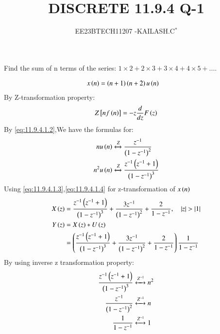 \documentclass[journal,12pt,twocolumn]{IEEEtran}
\theoremstyle{remark}
\begin{document}

\vspace{3cm}

\title{DISCRETE 11.9.4 Q-1}
\author{EE23BTECH11207 -KAILASH.C$^{*}$%
}
\maketitle
\newpage
\bigskip

\renewcommand{\thefigure}{\theenumi}
\renewcommand{\thetable}{\theenumi}


Find the sum of n terms of the series:
$1\times2+2\times3+3\times4+4\times5+....$\\
\solution
\fi

\begin{align}
 x\left(n\right)&=\left(n+1\right)\left(n+2\right)u\left(n\right)\label{eq:11.9.4.1.1}
\end{align}
By Z-transformation property:
\begin{align}
Z{}\left[nf\left(n\right)\right]=-z\frac{d}{dz}F\left(z\right)\label{eq:11.9.4.1.2}
\end{align}
By \eqref{eq:11.9.4.1.2},We have the formulas for:
\begin{align}
nu\left(n\right)&\xleftrightarrow[]{Z} \frac{z^{-1}}{\left(1-z^{-1}\right)^2}\label{eq:11.9.4.1.3}\\
n^2u\left(n\right)&\xleftrightarrow[]{Z}\frac{z^{-1}\left(z^{-1}+1\right)}{\left(1-z^{-1}\right)^3}\label{eq:11.9.4.1.4}
\end{align}
Using \eqref{eq:11.9.4.1.3},\eqref{eq:11.9.4.1.4} for z-transformation of $x\left(n\right)$
\begin{align}
    X\left(z\right)&=\frac{z^{-1}\left(z^{-1}+1\right)}{\left(1-z^{-1}\right)^3}+\frac{3z^{-1}}{\left(1-z^{-1}\right)^2}+\frac{2}{1-z^{-1}},\quad\left\vert z\right\vert>\left\vert1\right\vert\label{eq:11.9.4.1.5}\\
    Y\left(z\right)&=X\left(z\right)*U\left(z\right)\label{eq:11.9.4.1.6}\\
   &=\left(\frac{z^{-1}\left(z^{-1}+1\right)}{\left(1-z^{-1}\right)^3}+\frac{3z^{-1}}{\left(1-z^{-1}\right)^2}+\frac{2}{1-z^{-1}}\right)\frac{1}{1-z^{-1}}\label{eq:11.9.4.1.7}
\end{align}
By using inverse z transformation property:
\begin{align}
\frac{z^{-1}\left(z^{-1}+1\right)}{\left(1-z^{-1}\right)^3}&\xleftrightarrow[]{Z^{-1}} n^2\label{eq:11.9.4.1.8}\\
\frac{z^{-1}}{\left(1-z^{-1}\right)^2}&\xleftrightarrow[]{Z^{-1}} n\label{eq:11.9.4.1.9}\\
\frac{1}{1-z^{-1}}&\xleftrightarrow[]{Z^{-1}} 1\label{eq:11.9.4.1.10}
\end{align}
\end{document}
